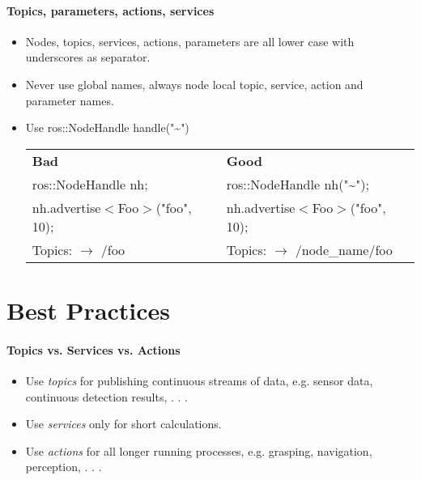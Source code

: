 \paragraph{Topics, parameters, actions, services}
\begin{itemize}[noitemsep]
\item Nodes, topics, services, actions, parameters are all lower case with underscores as separator.
\item Never use global names, always node local topic, service, action and parameter names. 
\item Use ros::NodeHandle handle("\textasciitilde")\\
\begin{tabular}{ll}
\textbf{Bad} & \textbf{Good}\\
ros::NodeHandle nh;         & ros::NodeHandle nh("\textasciitilde");\\
nh.advertise$<$Foo$>$("foo", 10); & nh.advertise$<$Foo$>$("foo", 10);\\
Topics: $\rightarrow$ /foo &
Topics: $\rightarrow$ /node\_name/foo
\end{tabular}
\end{itemize}


\section{Best Practices}
\paragraph{Topics vs. Services vs. Actions}
\begin{itemize}
\item Use \textit{topics} for publishing continuous streams of data, e.g. sensor data, continuous detection results, . . .\\
\item Use \textit{services} only for short calculations.\\
\item Use \textit{actions} for all longer running processes, e.g. grasping, navigation, perception, . . .
\end{itemize}


